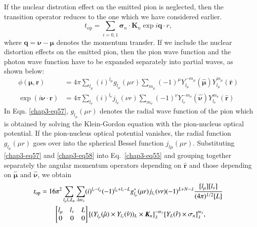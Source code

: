 If the nuclear distrotion effect on the emitted pion is neglected, then the transition operator reduces to the one which we have considered earlier.
\begin{equation}
t_{\text{op}} = \sum_{i=0, 1} {\boldsymbol\sigma}_n \cdot {\boldsymbol K}_n \exp i {\boldsymbol q \cdot r}, \label{chap3-eq56}
\end{equation}
where $\boldsymbol{q}= \boldsymbol{\nu -\mu}$ denotes the momentum transfer. If we include the nuclear distortion effects on the emitted pion, then the pion wave function and the photon wave function have to be expanded separately into partial waves, as shown below:
\begin{align}
  \phi \boldsymbol{(\mu , r)} & = 4 \pi \sum_{l_{\mu}} (i)^{l_\mu} g_{l_\mu}(\mu r)\sum_{m_\mu} (-1)^\mu Y_{l_\mu}^{-m _\mu} ({\boldsymbol \hat{\mu}}) Y_{l_\mu}^{m_\mu} ({\boldsymbol \hat{r}}) \label{chap3-eq57}\\
  \exp (i \boldsymbol{\nu \cdot r}) & = 4 \pi \sum_{l_\nu} (i)^{l_\nu} j_{l_\nu} (\nu r) \sum_{m_\nu} (-1)^\nu Y_{l_\nu}^{-m_\nu} ({\boldsymbol \hat{\nu}}) Y_{l_\nu}^{m_\nu} ({\boldsymbol \hat{r}}) \label{chap3-eq58}
\end{align}
In Eqn. \eqref{chap3-eq57}, $g_{l_\mu} (\mu r)$ denotes the radial wave function of the pion which is obtained by solving the Klein-Gordon equation with the pion-nucleus optical potential. If the pion-nucleus optical potential vanishes, the radial function $g_{l_\mu}(\mu r)$ goes over into the spherical Bessel function  $j_{l\mu}(\mu r)$. Substituting \eqref{chap3-eq57} and \eqref{chap3-eq58} into Eq.~\eqref{chap3-eq55} and grouping together separately the angular momentum operators depending on ${\boldsymbol \hat{r}}$ and those depending on ${\boldsymbol \hat{\mu}}$ and ${\boldsymbol \hat{\nu}}$, we obtain
\eject
\begin{align}
  t_{\text{op}} & = 16\pi^2 \sum_{l_\mu l_\nu L_n} \sum_{\lambda m_\lambda} (i)^{l_\nu - l_\mu} (-1)^{l_\mu + l_\nu - L} g_{l_\mu}^\ast (\mu r)j_{l_\nu} (\nu r) (-1)^{L+N-\lambda} \frac{[l_\mu][l_\nu]}{(4 \pi)^{1/2}[L]}\notag\\
  & \qquad \begin{bmatrix} l_\mu & l_\nu & L\\ 0 & 0 & 0   \end{bmatrix} [(Y_{l_\mu}(\hat{\mu}) \times Y_{l_\nu} (\hat{\nu}))_L \times {\boldsymbol K}_n]_\lambda^{-m_\lambda} [Y_L ({\boldsymbol \hat{r}}) \times \sigma_n]_{\lambda}^{m_\lambda}, \label{chap3-eq59}
\end{align}
